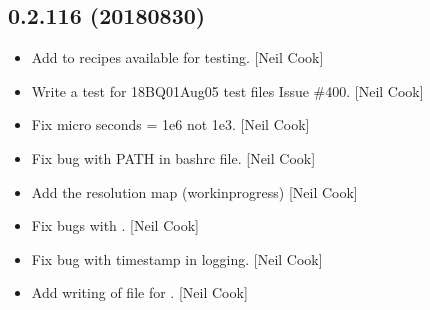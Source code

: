 \documentclass[a4paper,10pt,english]{report}
\begin{document}
\subsection{0.2.116 (2018\sphinxhyphen{}08\sphinxhyphen{}30)}
\label{\detokenize{misc/changelog:id363}}\begin{itemize}
\item {} 
Add  to recipes available for testing. {[}Neil
Cook{]}

\item {} 
Write a test for 18BQ01\sphinxhyphen{}Aug05 test files  \sphinxhyphen{} Issue
\#400. {[}Neil Cook{]}

\item {} 
Fix micro seconds = 1e\sphinxhyphen{}6 not 1e\sphinxhyphen{}3. {[}Neil Cook{]}

\item {} 
Fix bug with PATH in bashrc file. {[}Neil Cook{]}

\item {} 
Add the resolution map (work\sphinxhyphen{}in\sphinxhyphen{}progress) {[}Neil Cook{]}

\item {} 
Fix bugs with . {[}Neil Cook{]}

\item {} 
Fix bug with timestamp in logging. {[}Neil Cook{]}

\item {} 
Add writing of file for . {[}Neil Cook{]}

\end{itemize}
\end{document}
